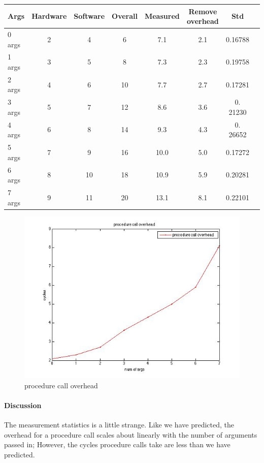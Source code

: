 \begin{center}
\begin{tabular}{l*{6}{c}r}
Args              & Hardware  & Software  & Overall  & Measured  & Remove overhead & Std\\
\hline
0 args & 2 & 4 & 6 & 7.1 & 2.1 & 0.16788\\
1 args & 3 & 5 & 8 & 7.3  & 2.3 & 0.19758 \\
2 args & 4 & 6 & 10 & 7.7 & 2.7 & 0.17281 \\
3 args & 5 & 7 & 12 & 8.6 & 3.6 & 0. 21230  \\
4 args & 6 & 8 & 14 & 9.3 & 4.3 & 0. 26652 \\
5 args & 7 & 9 & 16 & 10.0 & 5.0 & 0.17272 \\
6 args & 8 & 10 & 18 & 10.9 & 5.9 & 0.20281 \\
7 args & 9 & 11 & 20 & 13.1 & 8.1 & 0.22101 \\
\end{tabular}
\end{center}

\begin{figure}[htbp] %
   \centering
   \includegraphics[width=5in]{./pics/pcall.jpg} 
   \caption{procedure call overhead}
   \label{fig:procedure call overhead}
\end{figure}

\paragraph{Discussion}
The measurement statistics is a little strange. Like we have predicted, the overhead for a procedure call scales about linearly with the number of arguments passed in; However, the cycles procedure calls take are less than we have predicted. 

